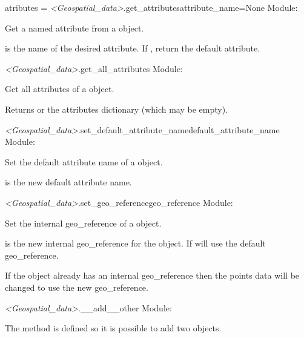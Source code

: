\documentclass{manual}
\begin{document}
\begin{methoddesc}{atributes = \emph{<Geospatial_data>}.get_attributes}{attribute_name=None}
Module: 

Get a named attribute from a  object.

 is the name of the desired attribute.  If , return 
the default attribute.
\end{methoddesc}

\begin{methoddesc}{\emph{<Geospatial_data>}.get_all_attributes}{}
Module: 

Get all attributes of a  object.

Returns  or the attributes dictionary (which may be empty).
\end{methoddesc}

\begin{methoddesc}{\emph{<Geospatial_data>}.set_default_attribute_name}{default_attribute_name}
Module: 

Set the default attribute name of a  object.

 is the new default attribute name.
\end{methoddesc}

\begin{methoddesc}{\emph{<Geospatial_data>}.set_geo_reference}{geo_reference}
Module: 

Set the internal geo_reference of a  object.

 is the new internal geo_reference for the object.
If  will use the default geo_reference.

If the  object already has an internal geo_reference
then the points data will be changed to use the new geo_reference.
\end{methoddesc}

\begin{methoddesc}{\emph{<Geospatial_data>}.__add__}{other}
Module: 

The  method is defined so it is possible to add two
 objects.
\end{methoddesc}
\end{document}
